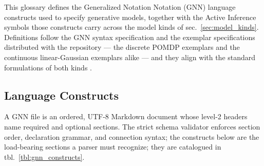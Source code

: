 \documentclass[
  english,
  9pt,
]{extarticle}
\begin{document}
This glossary defines the Generalized Notation Notation (GNN) language
constructs used to specify generative models, together with the Active
Inference symbols those constructs carry across the model kinds of
sec.~\ref{sec:model_kinds}. Definitions follow the GNN syntax
specification and the exemplar specifications distributed with the
repository --- the discrete POMDP exemplars and the continuous
linear-Gaussian exemplars alike --- and they align with the standard
formulations of both kinds \citep{gnn2023, dacosta2020, parr2022}.

\subsection{Language Constructs}\label{language-constructs}

A GNN file is an ordered, UTF-8 Markdown document whose level-2 headers
name required and optional sections. The strict schema validator
enforces section order, declaration grammar, and connection syntax; the
constructs below are the load-bearing sections a parser must recognize;
they are catalogued in tbl.~\ref{tbl:gnn_constructs}.
\end{document}
